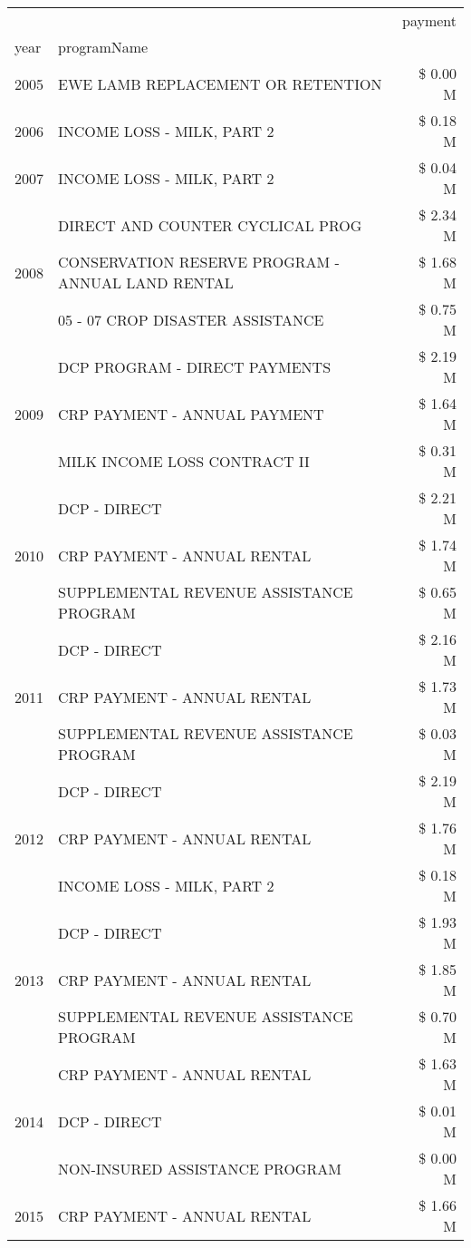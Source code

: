 \begin{tabular}{llr}
\toprule
 &  & payment \\
year & programName &  \\
\midrule
2005 & EWE LAMB REPLACEMENT OR RETENTION & \$ 0.00 M \\
\cline{1-3}
2006 & INCOME LOSS - MILK, PART 2 & \$ 0.18 M \\
\cline{1-3}
2007 & INCOME LOSS - MILK, PART 2 & \$ 0.04 M \\
\cline{1-3}
\multirow[t]{3}{*}{2008} & DIRECT AND COUNTER CYCLICAL PROG & \$ 2.34 M \\
 & CONSERVATION RESERVE PROGRAM - ANNUAL LAND RENTAL & \$ 1.68 M \\
 & 05 - 07 CROP DISASTER ASSISTANCE & \$ 0.75 M \\
\cline{1-3}
\multirow[t]{3}{*}{2009} & DCP PROGRAM - DIRECT PAYMENTS & \$ 2.19 M \\
 & CRP PAYMENT - ANNUAL PAYMENT & \$ 1.64 M \\
 & MILK INCOME LOSS CONTRACT II & \$ 0.31 M \\
\cline{1-3}
\multirow[t]{3}{*}{2010} & DCP - DIRECT & \$ 2.21 M \\
 & CRP PAYMENT - ANNUAL RENTAL & \$ 1.74 M \\
 & SUPPLEMENTAL REVENUE ASSISTANCE PROGRAM & \$ 0.65 M \\
\cline{1-3}
\multirow[t]{3}{*}{2011} & DCP - DIRECT & \$ 2.16 M \\
 & CRP PAYMENT - ANNUAL RENTAL & \$ 1.73 M \\
 & SUPPLEMENTAL REVENUE ASSISTANCE PROGRAM & \$ 0.03 M \\
\cline{1-3}
\multirow[t]{3}{*}{2012} & DCP - DIRECT & \$ 2.19 M \\
 & CRP PAYMENT - ANNUAL RENTAL & \$ 1.76 M \\
 & INCOME LOSS - MILK, PART 2 & \$ 0.18 M \\
\cline{1-3}
\multirow[t]{3}{*}{2013} & DCP - DIRECT & \$ 1.93 M \\
 & CRP PAYMENT - ANNUAL RENTAL & \$ 1.85 M \\
 & SUPPLEMENTAL REVENUE ASSISTANCE PROGRAM & \$ 0.70 M \\
\cline{1-3}
\multirow[t]{3}{*}{2014} & CRP PAYMENT - ANNUAL RENTAL & \$ 1.63 M \\
 & DCP - DIRECT & \$ 0.01 M \\
 & NON-INSURED ASSISTANCE PROGRAM & \$ 0.00 M \\
\cline{1-3}
\multirow[t]{3}{*}{2015} & CRP PAYMENT - ANNUAL RENTAL & \$ 1.66 M \\

\end{tabular}

